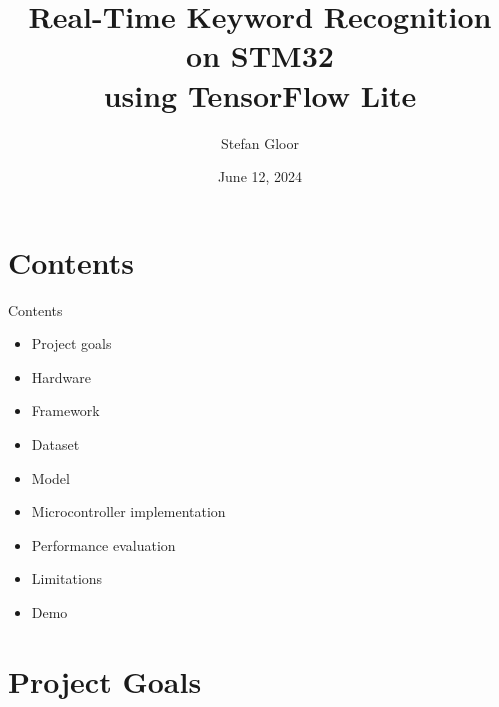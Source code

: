 \documentclass{beamer}
\title{Real-Time Keyword Recognition on STM32\\using TensorFlow Lite}
\institute{ETH Zürich}
\author{Stefan Gloor}
\date{June 12, 2024}
\begin{document}
\begin{frame}
	\titlepage
\end{frame}

\section*{Contents}
\begin{frame}{Contents}
	\begin{itemize}
		\item<2->Project goals
		\item<3->Hardware
		\item<4->Framework
		\item<5->Dataset
		\item<6->Model
		\item<7->Microcontroller implementation
		\item<8->Performance evaluation
		\item<9->Limitations
		\item<10->Demo
	\end{itemize}
\end{frame}

\section{Project Goals}
\end{document}
